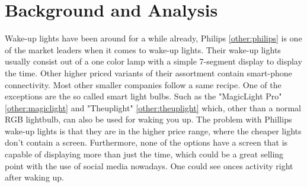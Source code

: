 \chapter{Background and Analysis}
Wake-up lights have been around for a while already, Philips \ref{other:philips} is one of the market leaders when it comes to wake-up lights. Their wake-up lights usually consist out of a one color lamp with a simple 7-segment display to display the time. Other higher priced variants of their assortment contain smart-phone connectivity. Most other smaller companies follow a same recipe. One of the exceptions are the so called smart light bulbs. Such as the "MagicLight Pro" \ref{other:magiclight} and "Theuplight" \ref{other:theuplight} which, other than a normal RGB lightbulb, can also be used for waking you up. The problem with Phillips wake-up lights is that they are in the higher price range, where the cheaper lights don't contain a screen. Furthermore, none of the options have a screen that is capable of displaying more than just the time, which could be a great selling point with the use of social media nowadays. One could see onces activity right after waking up.